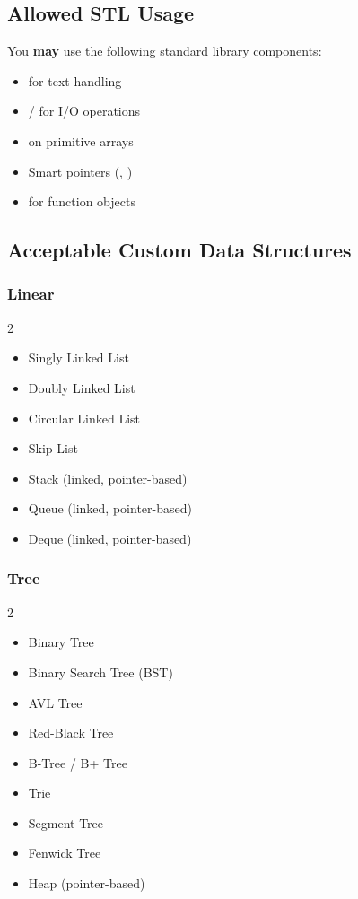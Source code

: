 \subsection{Allowed STL Usage}

You \textbf{may} use the following standard library components:

\begin{itemize}
  \item \stdstr{} for text handling
  \item \stdfstream{} / \stdiostream{} for I/O operations
  \item {} on primitive arrays
  \item Smart pointers (\stduptr, \stdsptr)
  \item {} for function objects
\end{itemize}

\subsection{Acceptable Custom Data Structures}

\subsubsection{Linear}

\begin{multicols}{2}
\begin{itemize}
  \item Singly Linked List
  \item Doubly Linked List
  \item Circular Linked List
  \item Skip List
  \item Stack (linked, pointer-based)
  \item Queue (linked, pointer-based)
  \item Deque (linked, pointer-based)
\end{itemize}
\end{multicols}

\subsubsection{Tree}

\begin{multicols}{2}
\begin{itemize}
  \item Binary Tree
  \item Binary Search Tree (BST)
  \item AVL Tree
  \item Red-Black Tree
  \item B-Tree / B+ Tree
  \item Trie
  \item Segment Tree
  \item Fenwick Tree
  \item Heap (pointer-based)
\end{itemize}
\end{multicols}

